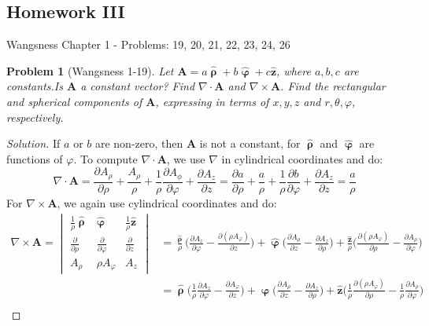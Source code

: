 \documentclass[oneside]{book}
\theoremstyle{mystyle}
\newtheorem{problem}{Problem}[section]
\begin{document}
\subsection{Homework III}
Wangsness Chapter 1 - Problems: 19, 20, 21, 22, 23, 24, 26
\begin{problem}[Wangsness 1-19]
Let $\mathbf{A} = a\hat{\boldsymbol{\uprho}}+b\hat{\boldsymbol{\upvarphi}}+c\hat{\mathbf{z}}$, where $a,b,c$ are constants.Is $\mathbf{A}$ a constant vector? Find $\nabla\cdot \mathbf{A}$ and $\nabla\times \mathbf{A}$. Find the rectangular and spherical components of $\mathbf{A}$, expressing in terms of $x,y,z$ and $r,\theta,\varphi$, respectively.
\end{problem}
\begin{proof}[Solution]
If $a$ or $b$ are non-zero, then $\mathbf{A}$ is not a constant, for $\hat{\boldsymbol{\uprho}}$ and $\hat{\boldsymbol{\upvarphi}}$ are functions of $\varphi$. To compute $\nabla \cdot \mathbf{A}$, we use $\nabla$ in cylindrical coordinates and do:
\begin{equation*}
    \nabla\cdot\mathbf{A}=\frac{\partial A_{\rho}}{\partial \rho}+\frac{A_{\rho}}{\rho}+\frac{1}{\rho}\frac{\partial A_{\phi}}{\partial\varphi}+\frac{\partial A_{z}}{\partial z}=\frac{\partial a}{\partial\rho}+\frac{a}{\rho}+\frac{1}{\rho}\frac{\partial b}{\partial\varphi}+\frac{\partial A_{z}}{\partial z}=\frac{a}{\rho}
\end{equation*}
For $\nabla\times\mathbf{A}$, we again use cylindrical coordinates and do:
\begin{align*}
    \nabla \times \mathbf{A} = \begin{vmatrix} \frac{1}{\rho}\hat{\boldsymbol{\uprho}}& \hat{\boldsymbol{\upvarphi}} & \frac{1}{\rho}\hat{\mathbf{z}} \\ \frac{\partial}{\partial \rho} & \frac{\partial}{\partial \varphi} & \frac{\partial}{\partial z} \\ A_{\rho} &  \rho A_{\varphi} & A_z \end{vmatrix}&= \frac{\hat{\boldsymbol{\uprho}}}{\rho}\bigg(\frac{\partial A_{z}}{\partial \varphi} - \frac{\partial (\rho A_{\varphi})}{\partial z}\bigg) + \hat{\boldsymbol{\upvarphi}}\bigg(\frac{\partial A_{\rho}}{\partial z} - \frac{\partial A_{z}}{\partial \rho}\bigg) + \frac{\hat{\mathbf{z}}}{\rho}\bigg(\frac{\partial (\rho A_{\varphi})}{\partial \rho} - \frac{\partial A_{\rho}}{\partial \varphi}\bigg)\\
    &=\hat{\boldsymbol{\uprho}}\bigg(\frac{1}{\rho}\frac{\partial A_{z}}{\partial\varphi}-\frac{\partial A_{\varphi}}{\partial z}\bigg)+\hat{\boldsymbol{\upvarphi}}\bigg(\frac{\partial A_{\rho}}{\partial z}-\frac{\partial A_{z}}{\partial \rho}\bigg)+\hat{\mathbf{z}}\bigg(\frac{1}{\rho}\frac{\partial (\rho A_{\varphi})}{\partial\rho}-\frac{1}{\rho}\frac{\partial A_{\rho}}{\partial \varphi}\bigg)\\

\end{align*}
\end{proof}
\end{document}
